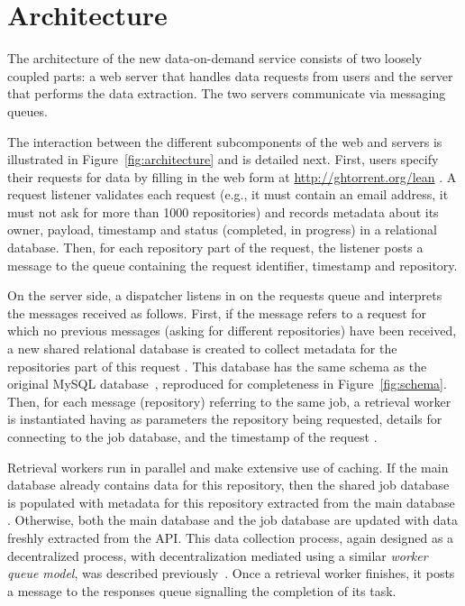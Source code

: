 
\section{Architecture}
\label{sec:arch}

The architecture of the new \ght data-on-demand service consists of two loosely coupled parts:
a web server that handles data requests from users and the \ght server that performs the data extraction.
The two servers communicate via messaging queues.

The interaction between the different subcomponents of the web and \ght servers is illustrated in
Figure~\ref{fig:architecture} and is detailed next.
First, users specify their requests for data by filling in the web form at \url{http://ghtorrent.org/lean} .
A request listener validates each request (e.g., it must contain an email address, it must not ask for
more than 1000 repositories)
and records metadata about its owner, payload,
timestamp and status (completed, in progress) in
a relational database.
Then, for each \gh repository part of the request, the listener posts a message to the queue 
containing the request identifier, timestamp and repository.

On the \ght server side, a dispatcher listens in on the requests queue  and interprets the
messages received as follows.
First, if the message refers to a request for which no previous messages (asking for different repositories)
have been received, a new shared relational database is created to collect metadata for the repositories part
of this request .
This database has the same schema as the original \ght MySQL database~\cite{gousios2012ghtorent},
reproduced for completeness in Figure~\ref{fig:schema}.
Then, for each message (repository) referring to the same job, a retrieval worker is instantiated having
as parameters the repository being requested, details for connecting to the job database, and the
timestamp of the request .

Retrieval workers run in parallel and make extensive use of caching.
If the main \ght database already contains data for this repository,
then the shared job database is populated with metadata for this
repository extracted from the main \ght database .
Otherwise, both the main \ght database and the job database  are updated with data freshly extracted
from the \gh API.
This data collection process, again designed as a decentralized process, with decentralization mediated
using a similar \emph{worker queue model}, was described previously~\cite{gousios2013ghtorent}.
Once a retrieval worker finishes, it posts a message to the responses queue  signalling
the completion of its task.

